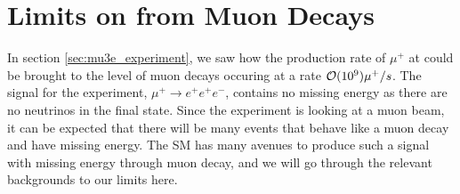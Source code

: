 \section{Limits on \mueee from Muon Decays}
In section \ref{sec:mu3e_experiment}, we saw how the production rate of $\mu^+$ at \mueee could be brought to the level of muon decays occuring at a rate $\operatorname{\mathcal{O}}(10^9) \mu^+/s$.
The signal for the \mueee experiment, $\mu^+ \rightarrow e^+ e^+ e^-$, contains no missing energy as there are no neutrinos in the final state.
Since the experiment is looking at a muon beam, it can be expected that there will be many events that behave like a muon decay and have missing energy.
The SM has many avenues to produce such a signal with missing energy through muon decay, and we will go through the relevant backgrounds to our limits here.
